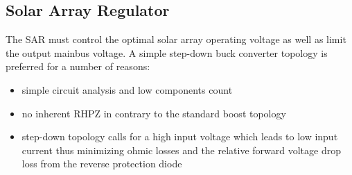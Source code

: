 \subsection{Solar Array Regulator}
The \ac{SAR} must control the optimal solar array operating voltage as well as limit the output mainbus voltage. A simple step-down buck converter topology is preferred for a number of reasons:
%
\begin{itemize}
\item simple circuit analysis and low components count
\item no inherent \ac{RHPZ} in contrary to the standard boost topology
\item step-down topology calls for a high input voltage which leads to low input current thus minimizing ohmic losses and the relative forward voltage drop loss from the reverse protection diode
\end{itemize}
%
